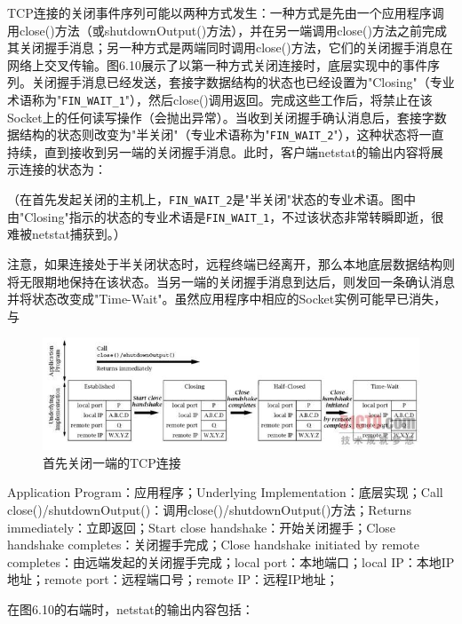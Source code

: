 		TCP连接的关闭事件序列可能以两种方式发生：一种方式是先由一个应用程序调用close()方法（或shutdownOutput()方法），并在另一端调用close()方法之前完成其关闭握手消息；另一种方式是两端同时调用close()方法，它们的关闭握手消息在网络上交叉传输。图6.10展示了以第一种方式关闭连接时，底层实现中的事件序列。关闭握手消息已经发送，套接字数据结构的状态也已经设置为"Closing"（专业术语称为"\verb|FIN_WAIT_1|"），然后close()调用返回。完成这些工作后，将禁止在该Socket上的任何读写操作（会抛出异常）。当收到关闭握手确认消息后，套接字数据结构的状态则改变为"半关闭"（专业术语称为"\verb|FIN_WAIT_2|"），这种状态将一直持续，直到接收到另一端的关闭握手消息。此时，客户端netstat的输出内容将展示连接的状态为：

		

		（在首先发起关闭的主机上，\verb|FIN_WAIT_2|是"半关闭"状态的专业术语。图中由"Closing"指示的状态的专业术语是\verb|FIN_WAIT_1|，不过该状态非常转瞬即逝，很难被netstat捕获到。）

		注意，如果连接处于半关闭状态时，远程终端已经离开，那么本地底层数据结构则将无限期地保持在该状态。当另一端的关闭握手消息到达后，则发回一条确认消息并将状态改变成"Time-Wait"。虽然应用程序中相应的Socket实例可能早已消失，与

		\begin{figure}[htbp]%
			\centering
			\includegraphics[scale=.6]{img/06.10.jpg}
			\caption{首先关闭一端的TCP连接}
			\label{fig:close.one.side.tcp}
		\end{figure}

		Application Program：应用程序；Underlying Implementation：底层实现；Call close()/shutdownOutput()：调用close()/shutdownOutput()方法；Returns immediately：立即返回；Start close handshake：开始关闭握手；Close handshake completes：关闭握手完成；Close handshake initiated by remote completes：由远端发起的关闭握手完成；local port：本地端口；local IP：本地IP地址；remote port：远程端口号；remote IP：远程IP地址；

		在图6.10的右端时，netstat的输出内容包括：

		

